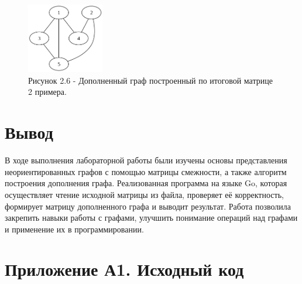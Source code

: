 \documentclass[oneside,a4paper,14pt]{extarticle}
\begin{document}
\begin{figure}[H]
	\centering
	\includegraphics[width=0.3\textwidth]{pics/complement_graph2.png}
	\caption*{Рисунок 2.6 - Дополненный граф построенный по итоговой матрице 2 примера.}
\end{figure}

\section*{Вывод}

В ходе выполнения лабораторной работы были изучены основы представления неориентированных графов с помощью матрицы смежности, а также алгоритм построения дополнения графа. Реализованная программа на языке Go, которая осуществляет чтение исходной матрицы из файла, проверяет её корректность, формирует матрицу дополненного графа и выводит результат. Работа позволила закрепить навыки работы с графами,
улучшить понимание операций над графами и применение их в программировании.



\newpage
\section*{Приложение А1. Исходный код}
\inputminted{go}{code/main.go}
\end{document}
